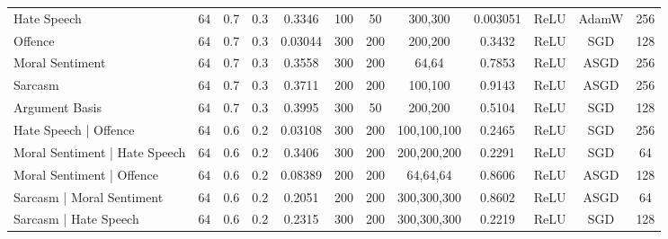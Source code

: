 {\begin{landscape}
\begin{table}[]
{\begin{tabular}{l|ccccccccccc}
      Hate Speech                                                        & 64         & 0.7              & 0.3              & 0.3346  & 100           & 50     & 300,300                 & 0.003051      & ReLU          & AdamW     & 256        \\
      Offence                                                            & 64         & 0.7              & 0.3              & 0.03044 & 300           & 200    & 200,200                 & 0.3432        & ReLU          & SGD       & 128        \\
      Moral Sentiment                                                    & 64         & 0.7              & 0.3              & 0.3558  & 300           & 200    & 64,64                   & 0.7853        & ReLU          & ASGD      & 256        \\
      Sarcasm                                                            & 64         & 0.7              & 0.3              & 0.3711  & 200           & 200    & 100,100                 & 0.9143        & ReLU          & ASGD      & 256        \\
      Argument Basis                                                     & 64         & 0.7              & 0.3              & 0.3995  & 300           & 50     & 200,200                 & 0.5104        & ReLU          & SGD       & 128        \\ \hline
      Hate Speech | Offence                                              & 64         & 0.6              & 0.2              & 0.03108 & 300           & 200    & 100,100,100             & 0.2465        & ReLU          & SGD       & 256        \\
      Moral Sentiment | Hate Speech                                      & 64         & 0.6              & 0.2              & 0.3406  & 300           & 200    & 200,200,200             & 0.2291        & ReLU          & SGD       & 64         \\
      Moral Sentiment | Offence                                          & 64         & 0.6              & 0.2              & 0.08389 & 200           & 200    & 64,64,64                & 0.8606        & ReLU          & ASGD      & 128        \\
      Sarcasm | Moral Sentiment                                          & 64         & 0.6              & 0.2              & 0.2051  & 200           & 200    & 300,300,300             & 0.8602        & ReLU          & ASGD      & 64         \\
      Sarcasm | Hate Speech                                              & 64         & 0.6              & 0.2              & 0.2315  & 300           & 200    & 300,300,300             & 0.2219        & ReLU          & SGD       & 128        \\

\end{tabular}}
\end{table}
\end{landscape}}
